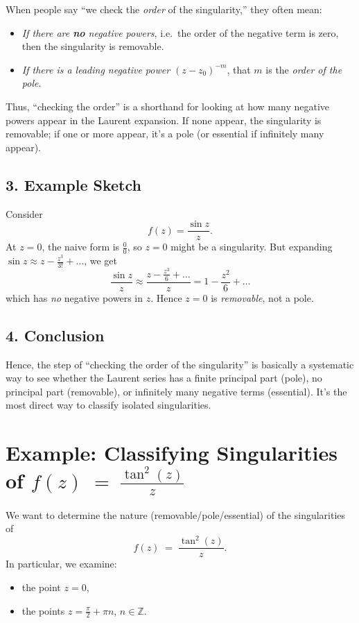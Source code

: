 \documentclass[12pt]{article}
\theoremstyle{definition} %
\theoremstyle{plain} %
\begin{document}
When people say “we check the \emph{order} of the singularity,” they often mean:

\begin{itemize}
  \item \emph{If there are \textbf{no} negative powers}, i.e.\ the order of the negative term is zero, then the singularity is removable.
  \item \emph{If there is a leading negative power $(z-z_0)^{-m}$}, that $m$ is the \emph{order of the pole}. 
\end{itemize}

Thus, “checking the order” is a shorthand for looking at how many negative powers appear in the Laurent expansion. If none appear, the singularity is removable; if one or more appear, it’s a pole (or essential if infinitely many appear).

\subsection*{3. Example Sketch}

Consider 
\[
f(z) = \frac{\sin z}{z}.
\]
At $z=0$, the naive form is $\frac{0}{0}$, so $z=0$ might be a singularity. But expanding $\sin z \approx z - \tfrac{z^3}{3!} + \dots$, we get
\[
\frac{\sin z}{z} \approx \frac{z - \frac{z^3}{6} + \dots}{z} = 1 - \frac{z^2}{6} + \dots
\]
which has \emph{no} negative powers in $z$. Hence $z=0$ is \emph{removable}, not a pole.

\subsection*{4. Conclusion}

Hence, the step of “checking the order of the singularity” is basically a systematic way to see whether the Laurent series has a finite principal part (pole), no principal part (removable), or infinitely many negative terms (essential). It’s the most direct way to classify isolated singularities.

\section*{Example: Classifying Singularities of \(\displaystyle f(z) \;=\;\frac{\tan^2(z)}{z}\)}

We want to determine the nature (removable/pole/essential) of the singularities of
\[
f(z) \;=\; \frac{\tan^2(z)}{z}.
\]
In particular, we examine:
\begin{itemize}
  \item the point \(z=0\),
  \item the points \(z=\frac{\pi}{2} + \pi n\), \(n \in \mathbb{Z}\).
\end{itemize}
\end{document}
